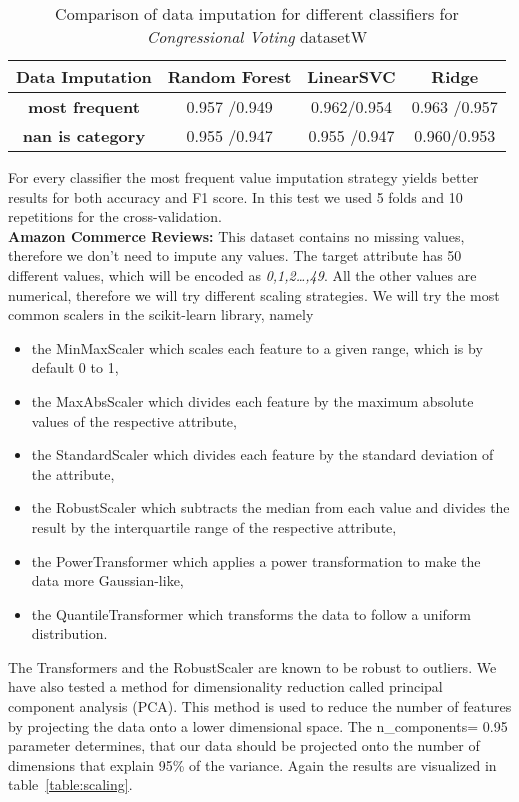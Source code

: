 \documentclass[a4paper,12pt]{article}
\begin{document}
\begin{table}[h!]
\centering
\begin{tabular}{|c|c|c|c|}
\hline
\textbf{Data Imputation} & \textbf{Random Forest} & \textbf{LinearSVC} & \textbf{Ridge} \\
\hline
\textbf{most frequent} & \cellcolor[HTML]{C1E1C1} 0.957 /0.949  & \cellcolor[HTML]{C1E1C1} 0.962/0.954  & \cellcolor[HTML]{C1E1C1} 0.963 /0.957 \\
\hline
\textbf{nan is category} & 0.955 /0.947 & 0.955 /0.947& 0.960/0.953  \\
\hline
\end{tabular}
\caption{Comparison of data imputation for different classifiers for \textit{Congressional Voting} datasetW}
\label{table:imputation}
\end{table}
For every classifier the most frequent value imputation strategy yields better results for both accuracy and F1 score.
In this test we used 5 folds and 10 repetitions for the cross-validation.\\
\textbf{Amazon Commerce Reviews:} This dataset contains no missing values, therefore we don't need to impute any values.
The target attribute has 50 different values, which will be encoded as \textit{0,1,2\ldots,49}. 
All the other values are numerical, therefore we will try different scaling strategies.
We will try the most common scalers in the scikit-learn library, namely 
\begin{itemize}
    \item the MinMaxScaler which scales each feature to a given range, which is by default 0 to 1,
    \item the MaxAbsScaler which divides each feature by the maximum absolute values of the respective attribute,
    \item the StandardScaler which divides each feature by the standard deviation of the attribute,
    \item the RobustScaler which subtracts the median from each value and divides the result by the interquartile range of the respective attribute,
    \item the PowerTransformer which applies a power transformation to make the data more Gaussian-like,
    \item the QuantileTransformer which transforms the data to follow a uniform distribution.
\end{itemize}
The Transformers and the RobustScaler are known to be robust to outliers. We have also tested a method for dimensionality reduction called
principal component analysis (PCA). This method is used to reduce the number of features by projecting the data onto a lower dimensional space. 
The n\_components= 0.95 parameter determines, that our data should be projected onto the number of dimensions that explain 95\% of the variance.
Again the results are visualized in table~\ref{table:scaling}.
\end{document}
